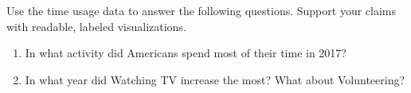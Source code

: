 \begin{problem}
Use the time usage data to answer the following questions. Support your claims with readable, labeled visualizations.
\begin{enumerate}
\item In what activity did Americans spend most of their time in 2017?

\item In what year did Watching TV increase the most? What about Volunteering?
\end{enumerate}
\end{problem}

